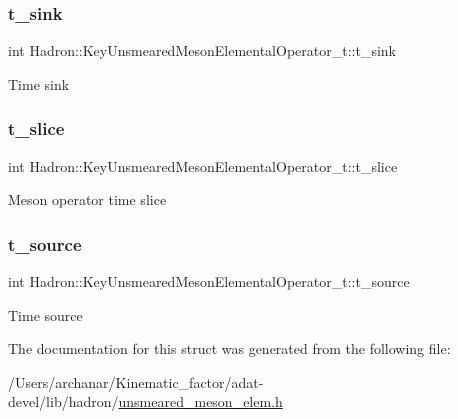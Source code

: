 \subsubsection{\texorpdfstring{t\_sink}{t\_sink}}
{\footnotesize\ttfamily int Hadron\+::\+Key\+Unsmeared\+Meson\+Elemental\+Operator\+\_\+t\+::t\+\_\+sink}

Time sink \mbox{\label{structHadron_1_1KeyUnsmearedMesonElementalOperator__t_ab1dad327f8aa5096c593e4c9d0662a7d}} 
\subsubsection{\texorpdfstring{t\_slice}{t\_slice}}
{\footnotesize\ttfamily int Hadron\+::\+Key\+Unsmeared\+Meson\+Elemental\+Operator\+\_\+t\+::t\+\_\+slice}

Meson operator time slice \mbox{\label{structHadron_1_1KeyUnsmearedMesonElementalOperator__t_a832a42e8cf448bcaaeb24f8e12ea67ee}} 
\subsubsection{\texorpdfstring{t\_source}{t\_source}}
{\footnotesize\ttfamily int Hadron\+::\+Key\+Unsmeared\+Meson\+Elemental\+Operator\+\_\+t\+::t\+\_\+source}

Time source 

The documentation for this struct was generated from the following file\+:\begin{DoxyCompactItemize}
\item 
/\+Users/archanar/\+Kinematic\+\_\+factor/adat-\/devel/lib/hadron/\mbox{\hyperlink{adat-devel_2lib_2hadron_2unsmeared__meson__elem_8h}{unsmeared\+\_\+meson\+\_\+elem.\+h}}\end{DoxyCompactItemize}
